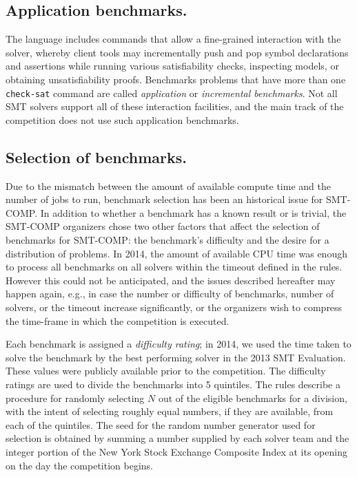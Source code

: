 \documentclass[twoside,11pt]{article}
\begin{document}
\subsection{Application benchmarks.} 

The language includes commands that allow a fine-grained interaction
with the solver, whereby client tools may incrementally push and pop
symbol declarations and assertions while running various
satisfiability checks, inspecting models, or obtaining unsatisfiability
proofs. Benchmarks problems that have more than one
\lstinline{check-sat} command are called \emph{application} or \emph{incremental
  benchmarks}. Not all SMT solvers support all of these interaction
facilities, and the main track of the competition does not use such
application benchmarks.


\subsection{Selection of benchmarks. \label{sec:benchmark-selection}} 

Due to the mismatch between the amount of available compute time and the number of jobs to run, benchmark selection has been an historical issue for SMT-COMP. In addition to whether a benchmark has a known result or is trivial, the SMT-COMP organizers chose two other factors that affect the selection of benchmarks for SMT-COMP: the benchmark's difficulty and the desire for a distribution of problems. In 2014, the amount of available CPU time was enough to process all benchmarks on all solvers within the timeout defined in the rules. However this could not be anticipated, and the issues described hereafter may happen again, e.g., in case the number or difficulty of benchmarks, number of solvers, or the timeout increase significantly, or the organizers wish to compress the time-frame in which the competition is executed.

Each benchmark is assigned a \emph{difficulty rating}; in 2014, we used the time taken to solve the benchmark by the best performing solver in the 2013 SMT Evaluation. These values were publicly available prior to the competition. The difficulty ratings are used to divide the benchmarks into 5 quintiles. The rules describe a procedure for randomly selecting $N$ out of the eligible benchmarks for a division, with the intent of selecting roughly equal numbers, if they are available, from each of the quintiles.  The seed for the random number generator used for selection is obtained by summing a number supplied by each solver team and the integer portion of the New York Stock Exchange Composite Index at its opening on the day the competition begins.
\end{document}

